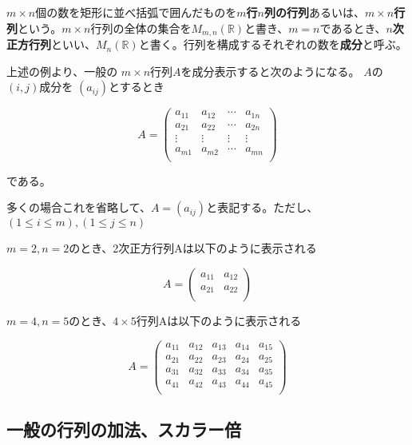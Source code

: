 \documentclass[dvipdfmx,autodetect-engine]{jsarticle}
\theoremstyle{definition}
\begin{document}
$m \times n$個の数を矩形に並べ括弧で囲んだものを{\bf $m$行$n$列の行列}あるいは、{\bf $m \times n$行列}という。$m \times n$行列の全体の集合を$M_{m,n}(\mathbb{R})$と書き、$m = n$であるとき、{\bf $n$次正方行列}といい、$M_n(\mathbb{R})$と書く。行列を構成するそれぞれの数を{\bf 成分}と呼ぶ。


上述の例より、一般の $m \times n$行列$A$を成分表示すると次のようになる。 $A$の $(i, j)$成分を $(a_{ij})$とするとき

$$
A = \begin{pmatrix}
a_{11} & a_{12} & \cdots & a_{1n} \\
a_{21} & a_{22} & \cdots & a_{2n} \\
\vdots & \vdots & \vdots & \vdots \\
a_{m1} & a_{m2} & \cdots & a_{mn} \\
\end{pmatrix}
$$

である。

多くの場合これを省略して、$A = (a_{ij})$と表記する。ただし、
$(1 \leq i \leq m), (1 \leq j \leq n)$


$m = 2, n = 2$のとき、2次正方行列Aは以下のように表示される

$$
A = \begin{pmatrix}
a_{11} & a_{12} \\
a_{21} & a_{22} \\
\end{pmatrix}
$$


$m = 4, n = 5$のとき、$4 \times 5$行列Aは以下のように表示される

$$
A = \begin{pmatrix}
a_{11} & a_{12} & a_{13} & a_{14} & a_{15} \\
a_{21} & a_{22} & a_{23} & a_{24} & a_{25} \\
a_{31} & a_{32} & a_{33} & a_{34} & a_{35} \\
a_{41} & a_{42} & a_{43} & a_{44} & a_{45} \\
\end{pmatrix}
$$

\subsection{一般の行列の加法、スカラー倍}\label{subsection:generalMatrixAdditionAndScalarMultiple}
\end{document}
